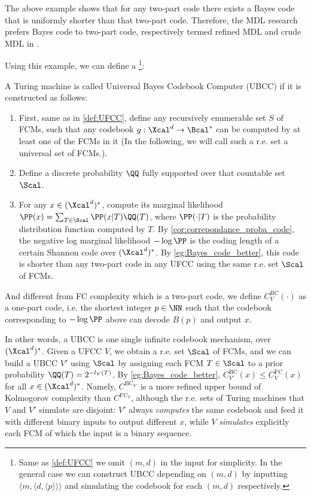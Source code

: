 The above example shows that for any two-part code there exists a Bayes code that is uniformly shorter than that two-part code. Therefore, the MDL research prefers Bayes code to two-part code, respectively termed refined MDL and crude MDL in \cite{grunwald2007minimum}. 

Using this example, we can define a \footnote{Same as \cref{def:UFCC} we omit $(m,d)$ in the input for simplicity. In the general case we can construct UBCC depending on $(m,d)$ by inputting $\langle m, \langle d, \langle p \rangle \rangle \rangle$ and simulating the codebook for each $(m,d)$ respectively.}:
\begin{definition}\label{def:UBCC}
    A Turing machine is called Universal Bayes Codebook Computer (UBCC) if it is constructed as follows:
\begin{enumerate}
    \item First, same as in \cref{def:UFCC}, define any recursively enumerable set $S$ of FCMs, such that any codebook $g:\Xcal^d \to \Bcal^*$ can be computed by at least one of the FCMs in it (In the following, we will call such a r.e. set a universal set of FCMs.).
    \item Define a discrete probability $\QQ$ fully supported over that countable set $\Scal$.
    \item For any $x\in (\Xcal^d)^*$, compute its marginal likelihood $\PP(x)= \sum_{T\in \Scal} \PP(x|T)\QQ(T)$, where $\PP(\cdot|T)$ is the probability distribution function computed by $T$. By \cref{cor:correpondance_proba_code}, the negative log marginal likelihood $-\log \PP$ is the coding length of a certain Shannon code over $(\Xcal^d)^*$. By \cref{eg:Bayes_code_better}, this code is shorter than any two-part code in any UFCC using the same r.e. set $\Scal$ of FCMs. 
\end{enumerate}
And different from FC complexity which is a two-part code, we define  $C^{\text{BC}}_V(\cdot)$ as a one-part code, i.e. the shortest integer $p\in \NN$ such that the codebook corresponding to $-\log \PP$ above can decode $B(p)$ and output $x$.
\end{definition}
In other words, a UBCC is one single infinite codebook mechanism, over $(\Xcal^d)^*$. Given a UFCC $V$, we obtain a r.e. set $\Scal$ of FCMs, and we can build a UBCC $V'$ using $\Scal$ by assigning each FCM $T\in \Scal$ to a prior probability $\QQ(T)= 2^{-l_V(T)}$. By \cref{eg:Bayes_code_better}, $C^{\text{BC}}_{V'}(x)\leq C^{\text{FC}}_V(x)$ for all $x\in (\Xcal^d)^*$. Namely, $C^{\text{BC}_{V'}}$ is a more refined upper bound of Kolmogorov complexity than $C^{\text{FC}_V}$, although the r.e. sets of Turing machines that $V$ and $V'$ simulate are disjoint: $V'$ always \textit{computes} the same codebook and feed it with different binary inputs to output different $x$, while $V$ \textit{simulates} explicitly each FCM of which the input is a binary sequence.

